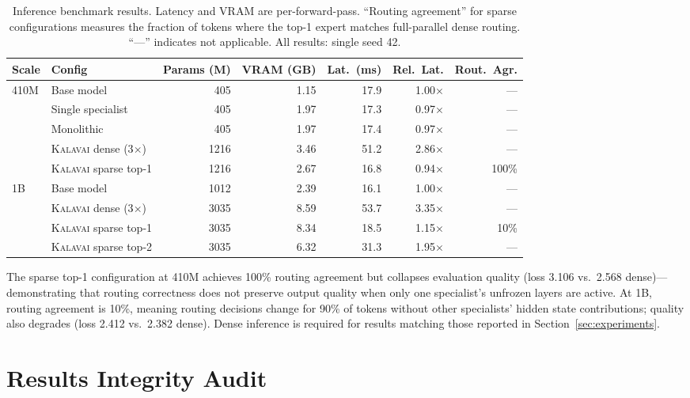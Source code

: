 \documentclass{article}
\newcommand{\kalavai}{\textsc{Kalavai}\xspace}
\begin{document}
\begin{table}[h]
\centering
\caption{Inference benchmark results. Latency and VRAM are per-forward-pass. ``Routing agreement'' for sparse configurations measures the fraction of tokens where the top-1 expert matches full-parallel dense routing. ``---'' indicates not applicable. All results: single seed 42.}
\label{tab:inferencebench}
\small
\begin{tabular}{llrrrrr}
\toprule
\textbf{Scale} & \textbf{Config} & \textbf{Params (M)} & \textbf{VRAM (GB)} & \textbf{Lat.\ (ms)} & \textbf{Rel.\ Lat.} & \textbf{Rout.\ Agr.} \\
\midrule
\multirow{5}{*}{410M}
 & Base model          & 405  & 1.15 & 17.9 & 1.00$\times$ & --- \\
 & Single specialist   & 405  & 1.97 & 17.3 & 0.97$\times$ & --- \\
 & Monolithic          & 405  & 1.97 & 17.4 & 0.97$\times$ & --- \\
 & \kalavai dense (3$\times$) & 1216 & 3.46 & 51.2 & 2.86$\times$ & --- \\
 & \kalavai sparse top-1 & 1216 & 2.67 & 16.8 & 0.94$\times$ & 100\% \\
\midrule
\multirow{4}{*}{1B}
 & Base model          & 1012 & 2.39 & 16.1 & 1.00$\times$ & --- \\
 & \kalavai dense (3$\times$) & 3035 & 8.59 & 53.7 & 3.35$\times$ & --- \\
 & \kalavai sparse top-1 & 3035 & 8.34 & 18.5 & 1.15$\times$ & 10\% \\
 & \kalavai sparse top-2 & 3035 & 6.32 & 31.3 & 1.95$\times$ & --- \\
\bottomrule
\end{tabular}
\end{table}

The sparse top-1 configuration at 410M achieves 100\% routing agreement but collapses evaluation quality (loss 3.106 vs.\ 2.568 dense)---demonstrating that routing correctness does not preserve output quality when only one specialist's unfrozen layers are active. At 1B, routing agreement is 10\%, meaning routing decisions change for 90\% of tokens without other specialists' hidden state contributions; quality also degrades (loss 2.412 vs.\ 2.382 dense). Dense inference is required for results matching those reported in Section~\ref{sec:experiments}.

\section{Results Integrity Audit}
\label{app:audit}
\end{document}

